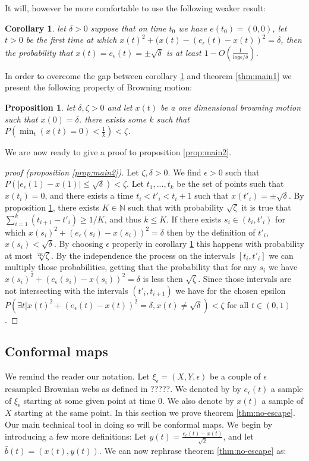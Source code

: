 \documentclass[11pt]{article}
\newtheorem{propos}{Proposition}
\newtheorem{cor}{Corollary}
\begin{document}
{It will, however be more comfortable to use the following weaker result:
\begin{cor}\label{cor:cor1}
let $\delta>0$ suppose that on time $t_0$ we have $e(t_0)=(0,0)$, let $t>0$ be the first time at which $x(t)^2+(x(t)-(e_\epsilon(t)-x(t))^2=\delta$, then the probability that $x(t)=e_\epsilon(t)=\pm\sqrt\delta$ is at least $1-O(\frac{1}{log\epsilon/\delta})$.
\end{cor}

In order to overcome the gap between corollary \ref{cor:cor1} and theorem \ref{thm:main1} we present the following property of Browning motion:
\begin{propos}\label{prop:prop1}
let $\delta,\zeta>0$ and let $x(t)$ be a one dimensional browning motion such that $x(0)=\delta$. there exists some $k$ such that $P(\min_t(x(t)=0)<\frac1k)<\zeta$.
\end{propos}

We are now ready to give a proof to proposition \ref{prop:main2}.

\begin{proof}[proof (proposition \ref{prop:main2})]
Let $\zeta,\delta>0$. We find $\epsilon>0$ such that $P(|e_\epsilon(1)- x(1)|\le\sqrt\delta)<\zeta$. Let $t_1,...,t_k$ be the set of points such that $x(t_i)=0$,
and there exists a time $t_i<t'_i<t_i+1$ such that $x(t'_i)=\pm\sqrt\delta$. By proposition \ref{prop:prop1}, there exists $K\in\mathbb{N}$ such that with probability
$\sqrt\zeta$ it is true that $\sum_{i=1}^k(t_{i+1}-t'_i)\ge1/K$, and thus $k\le K$. If there exists $s_i\in (t_i, t'_i)$ for which $x(s_i)^2+(e_\epsilon(s_i)-x(s_i))^2=\delta$ then by the definition of $t'_i$, $x(s_i)<\sqrt\delta$. By choosing $\epsilon$ properly in corollary \ref{cor:cor1}  this happens with probability at most $\sqrt[2K]{\zeta}$. By the independence the process on the  intervals $[t_i,t'_i]$ we can multiply those probabilities, getting that the probability that for any $s_i$ we have $x(s_i)^2+(e_\epsilon(s_i)-x(s_i))^2=\delta$ is less then $\sqrt\zeta$. Since those intervals are not intersecting with the intervals $(t'_i,t_{i+1})$ we have for the chosen epsilon $P(\exists t | x(t)^2+(e_\epsilon(t)-x(t))^2=\delta, x(t)\neq \sqrt \delta)<\zeta$ for all $t\in(0,1)$.
\end{proof}

\subsection{Conformal maps}\label{sec:conformal map}
We remind the reader our notation. Let $\xi_\epsilon=(X,Y,\epsilon)$ be a couple of $\epsilon$ resampled Brownian webs as defined in ?????. We denoted by by $e_\epsilon(t)$ a sample of $\xi_\epsilon$ starting at some given point at time $0$. We also denote by $x(t)$ a sample of $X$ starting at the same point.
In this section we prove theorem \ref{thm:no-escape}. Our main technical tool in doing so will be conformal maps. We begin by introducing a few more definitions:
Let $y(t)=\frac{e_\epsilon(t)-x(t)}{\sqrt2}$, and let $\bar{b}(t)=(x(t),y(t))$. We can now rephrase theorem \ref{thm:no-escape} as:

}
\end{document}
